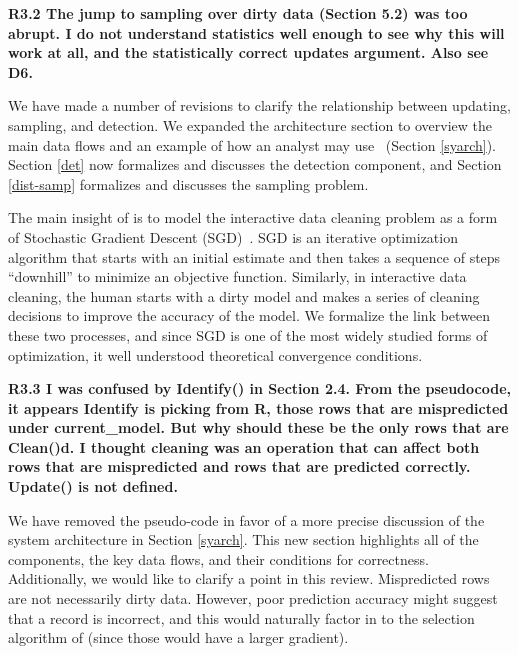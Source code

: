 \vspace{0.5em}

\noindent\textbf{R3.2 The jump to sampling over dirty data (Section 5.2) was too abrupt.
I do not understand statistics well enough to see why this will work at all,
and the statistically correct updates argument. Also see D6.}

\noindent  We have made a number of revisions to clarify the relationship between updating, sampling, and detection. We expanded the architecture section to overview the main data flows and an example of how an analyst may use \sys~(Section \ref{syarch}). Section \ref{det} now formalizes and discusses the detection component, and Section \ref{dist-samp} formalizes and discusses the sampling problem.

The main insight of \sys is to model the interactive data cleaning problem as a form of Stochastic Gradient Descent (SGD)~\cite{bottou2012stochastic}.
SGD is an iterative optimization algorithm that starts with an initial estimate and then takes a sequence of steps ``downhill'' to minimize an objective function.
Similarly, in interactive data cleaning, the human starts with a dirty model and makes a series of cleaning decisions to improve the accuracy of the model.
We formalize the link between these two processes, and since SGD is one of the most widely studied forms of optimization, it well understood theoretical convergence conditions.


\vspace{0.5em}

\noindent \textbf{R3.3 I was confused by Identify() in Section 2.4.
From the pseudocode, it appears Identify is picking from R,
those rows that are mispredicted under current\_model.
But why should these be the only rows that are Clean()d.
I thought cleaning was an operation that can
affect both rows that are mispredicted and rows that
are predicted correctly. Update() is not defined.}

\noindent  We have removed the pseudo-code in favor of a more precise discussion of the system architecture in Section \ref{syarch}. This new section highlights all of the components, the key data flows, and their conditions for correctness. 
Additionally, we would like to clarify a point in this review. 
Mispredicted rows are not necessarily dirty data. 
However, poor prediction accuracy might suggest that a record is incorrect, and this would naturally factor in to the selection algorithm of \sys (since those would have a larger gradient).

